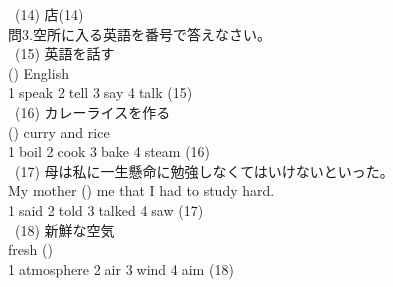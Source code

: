 \documentclass[uplatex]{jsarticle}
\begin{document}
\ (14) 店\hspace{\fill}(14)\underline{\hspace{35mm}}\\
\Large 問3.空所に入る英語を番号で答えなさい。\\
\large\ (15) 英語を話す\\
\hspace{10mm}(\hspace{10mm}) English\\
\hspace{10mm}\textcircled{\normalsize1}speak \textcircled{\normalsize2}tell 
\textcircled{\normalsize3}say \textcircled{\normalsize4}talk 
\hspace{\fill}(15)\underline{\hspace{35mm}}\\
\ (16) カレーライスを作る\\
\hspace{10mm}(\hspace{10mm}) curry and rice\\
\hspace{10mm}\textcircled{\normalsize1}boil \textcircled{\normalsize2}cook 
\textcircled{\normalsize3}bake \textcircled{\normalsize4}steam 
\hspace{\fill}(16)\underline{\hspace{35mm}}\\
\ (17) 母は私に一生懸命に勉強しなくてはいけないといった。\\
\hspace{10mm}My mother (\hspace{10mm}) me that I had to study hard.\\
\hspace{10mm}\textcircled{\normalsize1}said \textcircled{\normalsize2}told 
\textcircled{\normalsize3}talked \textcircled{\normalsize4}saw 
\hspace{\fill}(17)\underline{\hspace{35mm}}\\
\ (18) 新鮮な空気\\
\hspace{10mm}fresh (\hspace{10mm})\\
\hspace{10mm}\textcircled{\normalsize1}atmosphere \textcircled{\normalsize2}air 
\textcircled{\normalsize3}wind \textcircled{\normalsize4}aim 
\hspace{\fill}(18)\underline{\hspace{35mm}}\\
\end{document}
